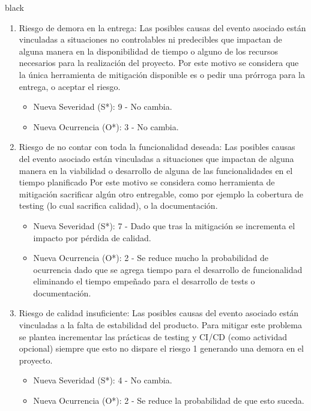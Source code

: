 \documentclass[
11pt, %
codirector, %
]{charter}
\begin{document}
\begin{consigna}{black}
\begin{enumerate}
	\item Riesgo de demora en la entrega: Las posibles causas del evento asociado están vinculadas a situaciones no controlables ni predecibles que impactan de alguna manera en la disponibilidad de tiempo o alguno de los recursos necesarios para la realización del proyecto. Por este motivo se considera que la única herramienta de mitigación disponible es o pedir una prórroga para la entrega, o aceptar el riesgo.
	\begin{itemize}
		\item Nueva Severidad (S*): 9 - No cambia.
		\item Nueva Ocurrencia (O*): 3 - No cambia.
	\end{itemize}
	
	\item Riesgo de no contar con toda la funcionalidad deseada: Las posibles causas del evento asociado están vinculadas a situaciones que impactan de alguna manera en la viabilidad o desarrollo de alguna de las funcionalidades en el tiempo planificado Por este motivo se considera como herramienta de mitigación sacrificar algún otro entregable, como por ejemplo la cobertura de testing (lo cual sacrifica calidad), o la documentación.
	\begin{itemize}
		\item Nueva Severidad (S*): 7 - Dado que tras la mitigación se incrementa el impacto por pérdida de calidad.
		\item Nueva Ocurrencia (O*): 2 - Se reduce mucho la probabilidad de ocurrencia dado que se agrega tiempo para el desarrollo de funcionalidad eliminando el tiempo empeñado para el desarrollo de tests o documentación.
	\end{itemize}
	
	
	\item Riesgo de calidad insuficiente: Las posibles causas del evento asociado están vinculadas a la falta de estabilidad del producto. Para mitigar este problema se plantea incrementar las prácticas de testing y CI/CD (como actividad opcional) siempre que esto no dispare el riesgo 1 generando una demora en el proyecto.
	\begin{itemize}
		\item Nueva Severidad (S*): 4 - No cambia.
		\item Nueva Ocurrencia (O*): 2 - Se reduce la probabilidad de que esto suceda.
	\end{itemize}	
	

\end{enumerate}
\end{consigna}
\end{document}
